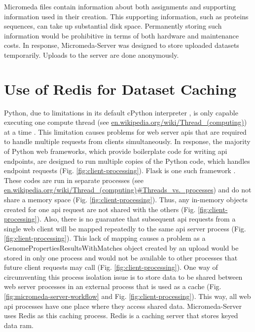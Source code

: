 Micromeda files contain information about both assignments and supporting information used in their creation. This supporting information, such as proteins sequences, can take up substantial disk space. Permanently storing such information would be prohibitive in terms of both hardware and maintenance costs. In response, Micromeda-Server was designed to store uploaded datasets temporarily. Uploads to the server are done anonymously. 

\section{Use of Redis for Dataset Caching} \label{redis-caching}

Python, due to limitations in its default cPython interpreter \cite{van1995python}, is only capable executing one compute thread \cite{saltzer1966traffic} (see \href{http://en.wikipedia.org/wiki/Thread_(computing)}{en.wikipedia.org/wiki/Thread\_(computing)}) at a time \cite{beazley2010understanding}. This limitation causes problems for web server \gls{api}s that are required to handle multiple requests from clients simultaneously. In response, the majority of Python web frameworks, which provide boilerplate code for writing \gls{api} endpoints, are designed to run multiple copies of the Python code, which handles endpoint requests (Fig. \ref{fig:client-processing}). Flask is one such framework \cite{grinberg2018flask}. These codes are run in separate processes (see \href{http://en.wikipedia.org/wiki/Thread_(computing)\#Threads\_vs.\_processes}{en.wikipedia.org/wiki/Thread\_(computing)\#Threads\_vs.\_processes}) and do not share a memory space (Fig. \ref{fig:client-processing}). Thus, any in-memory objects created for one \gls{api} request are not shared with the others (Fig. \ref{fig:client-processing}). Also, there is no guarantee that subsequent \gls{api} requests from a single web client will be mapped repeatedly to the same \gls{api} server process (Fig. \ref{fig:client-processing}). This lack of mapping causes a problem as a GenomePropertiesResultsWithMatches object created by an upload would be stored in only one process and would not be available to other processes that future client requests may call (Fig. \ref{fig:client-processing}). One way of circumventing this process isolation issue is to store data to be shared between web server processes in an external process that is used as a cache (Fig. \ref{fig:micromeda-server-workflow} and Fig. \ref{fig:client-processing}). This way, all web \gls{api} processes have one place where they access shared data. Micromeda-Server uses Redis as this caching process. Redis is a caching server that stores keyed data \gls{ram}. 

